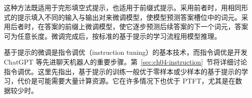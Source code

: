 这种方法既适用于完形填空式提示，也适用于前缀式提示。采用前者时，用相同形式的提示填入不同的输入与输出对来微调模型，使模型预测答案槽位中的词元。采用后者时，在答案的前缀上微调模型，使它逐步预测后续答案的下一个词元，答案可为任意长度。微调完成后，按标准的基于提示的学习流程用模型推理。

\begin{keypoint}
基于提示的微调是指令调优（instruction tuning）的基本技术，而指令调优是开发 ChatGPT 等先进聊天机器人的重要步骤。第~\ref{sec:ch04-instruction}~节将详细讨论指令调优。这里先指出，基于提示的训练一般优于零样本或少样本的基于提示的学习，代价是可能需要大量计算资源。它在许多情况下也优于 PTFT，尤其是在数据较少时。
\end{keypoint}
